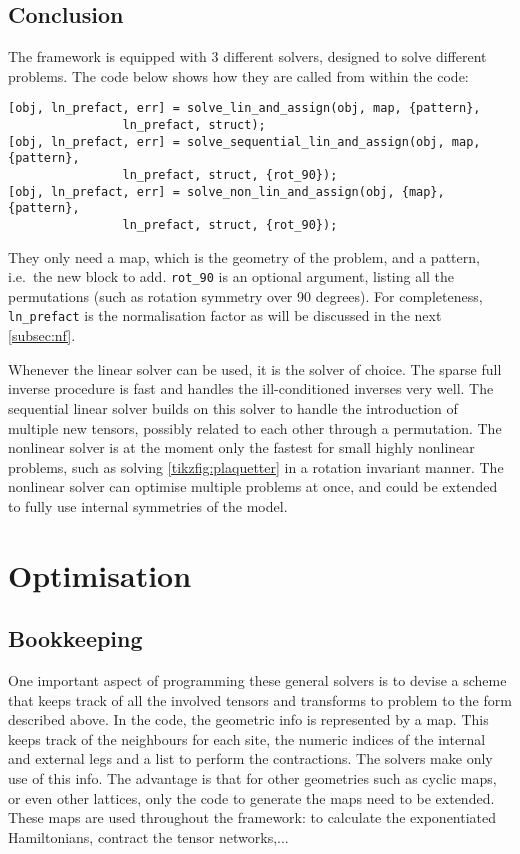 \subsection{Conclusion}

The framework is equipped with 3 different solvers, designed to solve different problems. The code below shows how they are called from within the code:
\begin{verbatim}
[obj, ln_prefact, err] = solve_lin_and_assign(obj, map, {pattern}, 
                ln_prefact, struct);
[obj, ln_prefact, err] = solve_sequential_lin_and_assign(obj, map, {pattern},
                ln_prefact, struct, {rot_90});
[obj, ln_prefact, err] = solve_non_lin_and_assign(obj, {map}, {pattern}, 
                ln_prefact, struct, {rot_90});
\end{verbatim}
They only need a map, which is the geometry of the problem, and a pattern, i.e.\ the new block to add. \verb#rot_90# is an optional argument, listing all the permutations (such as rotation symmetry over 90 degrees). For completeness, \verb#ln_prefact# is the normalisation factor as will be discussed in the next \cref{subsec:nf}.

Whenever the linear solver can be used, it is the solver of choice. The sparse full inverse procedure is fast and handles the ill-conditioned inverses very well. The sequential linear solver builds on this solver to handle the introduction of multiple new tensors, possibly related to each other through a permutation. The nonlinear solver is at the moment only the fastest for small highly nonlinear problems, such as solving \cref{tikzfig:plaquetter} in a rotation invariant manner. The nonlinear solver can optimise multiple problems at once, and could be extended to fully use internal symmetries of the model.

\section{Optimisation}

\subsection{Bookkeeping}

One important aspect of programming these general solvers is to devise a scheme that keeps track of all the involved tensors and transforms to problem to the form described above. In the code, the geometric info is represented by a map. This keeps track of the neighbours for each site, the numeric indices of the internal and external legs and a list to perform the contractions. The solvers make only use of this info. The advantage is that for other geometries such as cyclic maps, or even other lattices, only the code to generate the maps need to be extended. These maps are used throughout the framework: to calculate the exponentiated Hamiltonians, contract the tensor networks,...


